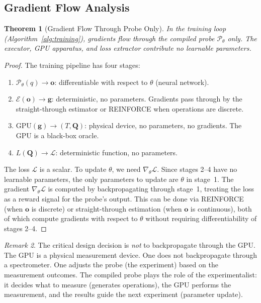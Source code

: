 \documentclass[11pt,twocolumn,a4paper]{article}
\newtheorem{theorem}{Theorem}[section]
\theoremstyle{definition}
\theoremstyle{remark}
\newtheorem{remark}[theorem]{Remark}
\newcommand{\loss}{\mathcal{L}}
\newcommand{\params}{\theta}
\newcommand{\probe}{\mathcal{P}}
\newcommand{\engine}{\mathcal{E}}
\begin{document}
\subsection{Gradient Flow Analysis}

\begin{theorem}[Gradient Flow Through Probe Only]
\label{thm:gradient_flow}
In the training loop (Algorithm~\ref{alg:training}), gradients flow through the compiled probe $\probe_\params$ only. The executor, GPU apparatus, and loss extractor contribute no learnable parameters.
\end{theorem}

\begin{proof}
The training pipeline has four stages:
\begin{enumerate}[nosep]
\item $\probe_\params(q) \to \mathbf{o}$: differentiable with respect to $\params$ (neural network).
\item $\engine(\mathbf{o}) \to \mathbf{g}$: deterministic, no parameters. Gradients pass through by the straight-through estimator or REINFORCE \citep{sachikonye2025f} when operations are discrete.
\item $\text{GPU}(\mathbf{g}) \to (T, \mathbf{Q})$: physical device, no parameters, no gradients. The GPU is a black-box oracle.
\item $L(\mathbf{Q}) \to \loss$: deterministic function, no parameters.
\end{enumerate}
The loss $\loss$ is a scalar. To update $\params$, we need $\nabla_\params \loss$. Since stages 2--4 have no learnable parameters, the only parameters to update are $\params$ in stage~1. The gradient $\nabla_\params \loss$ is computed by backpropagating through stage~1, treating the loss as a reward signal for the probe's output. This can be done via REINFORCE (when $\mathbf{o}$ is discrete) or straight-through estimation (when $\mathbf{o}$ is continuous), both of which compute gradients with respect to $\params$ without requiring differentiability of stages 2--4.
\end{proof}

\begin{remark}
The critical design decision is \emph{not} to backpropagate through the GPU. The GPU is a physical measurement device. One does not backpropagate through a spectrometer. One adjusts the probe (the experiment) based on the measurement outcomes. The compiled probe plays the role of the experimentalist: it decides what to measure (generates operations), the GPU performs the measurement, and the results guide the next experiment (parameter update).
\end{remark}
\end{document}
